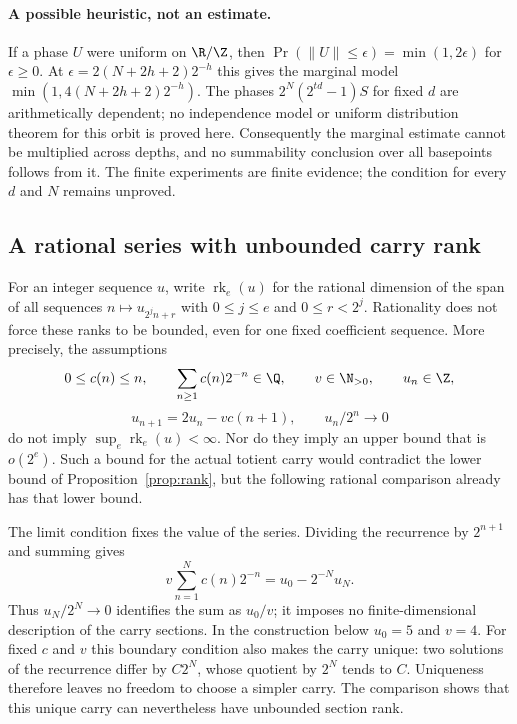 \paragraph{A possible heuristic, not an estimate.}
If a phase $U$ were uniform on $\R/\Z$, then
$\Pr(\|U\|\le\epsilon)=\min(1,2\epsilon)$ for $\epsilon\ge0$.
At $\epsilon=2(N+2h+2)2^{-h}$ this gives the marginal model
$\min(1,4(N+2h+2)2^{-h})$. The phases
$2^N(2^{td}-1)S$ for fixed $d$ are arithmetically dependent; no independence
model or uniform distribution theorem for this orbit is proved here.
Consequently the marginal estimate cannot be multiplied across depths, and
no summability conclusion over all basepoints follows from it. The finite
experiments are finite evidence; the condition for every $d$ and $N$
remains unproved.

\subsection{A rational series with unbounded carry rank}
\label{sub:generic-carry-rank}

For an integer sequence $u$, write $\operatorname{rk}_e(u)$ for the
rational dimension of the span of all sequences
$n\mapsto u_{2^j n+r}$ with $0\le j\le e$ and $0\le r<2^j$.
Rationality does not force these ranks to be bounded, even for one fixed
coefficient sequence. More precisely, the assumptions
\[
 0\le c(n)\le n,\qquad \sum_{n\ge1}c(n)2^{-n}\in\Q,
 \qquad v\in\N_{>0},\qquad u_n\in\Z,
\]
\[
 u_{n+1}=2u_n-vc(n+1),\qquad u_n/2^n\longrightarrow0
\]
do not imply $\sup_e\operatorname{rk}_e(u)<\infty$. Nor do they imply
an upper bound that is $o(2^e)$. Such a bound for the actual totient
carry would contradict the lower bound of Proposition~\ref{prop:rank},
but the following rational comparison already has that lower bound.

The limit condition fixes the value of the series. Dividing the
recurrence by $2^{n+1}$ and summing gives
\[
 v\sum_{n=1}^{N}c(n)2^{-n}=u_0-2^{-N}u_N.
\]
Thus $u_N/2^N\to0$ identifies the sum as $u_0/v$; it imposes no
finite-dimensional description of the carry sections. In the
construction below $u_0=5$ and $v=4$.
For fixed $c$ and $v$ this boundary condition also makes the carry
unique: two solutions of the recurrence differ by $C2^N$, whose
quotient by $2^N$ tends to $C$. Uniqueness therefore leaves no freedom
to choose a simpler carry. The comparison shows that this unique
carry can nevertheless have unbounded section rank.

